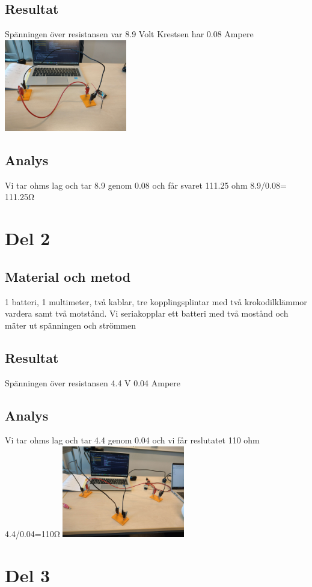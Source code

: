 \documentclass[11p]{article}
\begin{document}
    \subsection{Resultat}
    Spänningen över resistansen var 8.9 Volt
    Krestsen har 0.08 Ampere
    \includegraphics[width=0.4\textwidth]{../images/labb1.png}
    \subsection{Analys}
    Vi tar ohms lag och tar 8.9 genom 0.08 och får svaret 111.25 ohm
    8.9/0.08= 111.25Ω
    \section{Del 2}
    \subsection{Material och metod}
    1 batteri, 1 multimeter, två kablar, tre kopplingsplintar med två krokodilklämmor vardera samt två motstånd.
    Vi seriakopplar ett batteri med två mostånd och mäter ut spänningen och strömmen
    \subsection{Resultat}
    Spänningen över resistansen 4.4 V
    0.04 Ampere
    \subsection{Analys}
    Vi tar ohms lag och tar 4.4 genom 0.04 och vi får reslutatet 110 ohm
    4.4/0.04=110Ω
    \includegraphics[width=0.4\textwidth]{../images/labb2.jpg}
    \section{Del 3}
\end{document}
